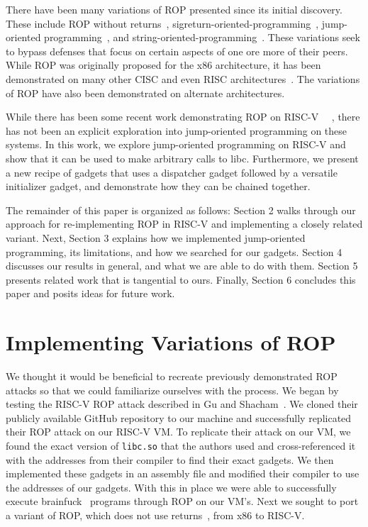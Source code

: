 There have been many variations of ROP presented since its initial discovery.
These include ROP without returns~\cite{checkoway10ropnoret},
sigreturn-oriented-programming~\cite{bosman14sigrop},
jump-oriented programming~\cite{bletsch11jopx86}, and string-oriented-programming~\cite{payer13sop}. These variations
seek to bypass defenses that focus on certain aspects of one ore more of their
peers. While ROP was originally proposed for the x86 architecture, it has been
demonstrated on many other CISC and even RISC architectures~\cite{buchanan08roprisc,kornau10roparm}. The variations of
ROP have also been demonstrated on alternate architectures.

While there has been some recent work demonstrating ROP on RISC-V~%
~\cite{gu20ropriscv,jaloyan20ropriscv}, there has not been an explicit
exploration into jump-oriented programming on these systems. In this work, we
explore jump-oriented programming on RISC-V and show that it can be used to make
arbitrary calls to libc. Furthermore, we present a new recipe of gadgets that
uses a dispatcher gadget followed by a versatile initializer gadget, and
demonstrate how they can be chained together.

The remainder of this paper is organized as follows: Section 2 walks through our
approach for re-implementing ROP in RISC-V and implementing a closely related
variant. Next, Section 3 explains how we implemented jump-oriented programming,
its limitations, and how we searched for our gadgets. Section 4 discusses our
results in general, and what we are able to do with them. Section 5 presents
related work that is tangential to ours. Finally, Section 6 concludes this paper
and posits ideas for future work.

\section{Implementing Variations of ROP}

We thought it would be beneficial to recreate previously demonstrated ROP attacks
so that we could familiarize ourselves with the process. We began by testing the
RISC-V ROP attack described in Gu and Shacham~\cite{gu20ropriscv}. We cloned
their publicly available GitHub repository to our machine and successfully
replicated their ROP attack on our RISC-V VM. To replicate their attack on our VM, we
found the exact version of \verb|libc.so| that the authors used and cross-referenced
it with the addresses from their compiler to find their exact gadgets. We then
implemented these gadgets in an assembly file and modified their compiler to use
the addresses of our gadgets. With this in place we were able to successfully execute
brainfuck~\cite{gu20ropriscv,brainfuck} programs through ROP on our VM's. Next we sought to port a variant of
ROP, which does not use returns~\cite{checkoway10ropnoret}, from x86 to RISC-V.

